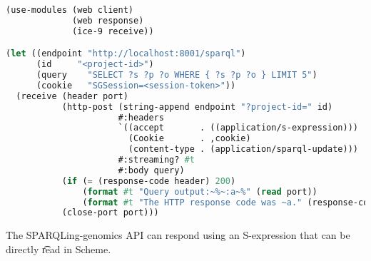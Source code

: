 \begin{lstlisting}[language=Lisp]
(use-modules (web client)
             (web response)
             (ice-9 receive))

(let ((endpoint "http://localhost:8001/sparql")
      (id     "<project-id>")
      (query    "SELECT ?s ?p ?o WHERE { ?s ?p ?o } LIMIT 5")
      (cookie   "SGSession=<session-token>"))
  (receive (header port)
           (http-post (string-append endpoint "?project-id=" id)
                      #:headers
                      `((accept       . ((application/s-expression)))
                        (Cookie       . ,cookie)
                        (content-type . (application/sparql-update)))
                      #:streaming? #t
                      #:body query)
           (if (= (response-code header) 200)
               (format #t "Query output:~%~:a~%" (read port))
               (format #t "The HTTP response code was ~a." (response-code header)))
           (close-port port)))
\end{lstlisting}

  The SPARQLing-genomics API can respond using an S-expression that can be directly
  \t{read} in Scheme.
